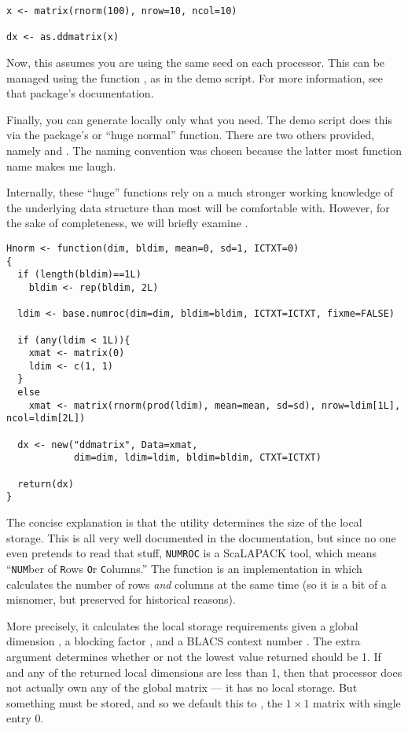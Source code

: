 \begin{lstlisting}[language=rr]
x <- matrix(rnorm(100), nrow=10, ncol=10)

dx <- as.ddmatrix(x)
\end{lstlisting}

Now, this assumes you are using the same seed on each processor.  This can be managed using the  function , as in the demo script.  For more information, see that package's documentation.

Finally, you can generate locally only what you need.  The demo script does this via the  package's  or ``huge normal'' function.  There are two others provided, namely  and .  The naming convention was chosen because the latter most function name makes me laugh.

Internally, these ``huge'' functions rely on a much stronger working knowledge of the underlying data structure than most will be comfortable with.  However, for the sake of completeness, we will briefly examine .

\begin{lstlisting}[language=rr,title=Hnorm()]
Hnorm <- function(dim, bldim, mean=0, sd=1, ICTXT=0)
{
  if (length(bldim)==1L)
    bldim <- rep(bldim, 2L)
  
  ldim <- base.numroc(dim=dim, bldim=bldim, ICTXT=ICTXT, fixme=FALSE)
    
  if (any(ldim < 1L)){
    xmat <- matrix(0)
    ldim <- c(1, 1)
  }
  else
    xmat <- matrix(rnorm(prod(ldim), mean=mean, sd=sd), nrow=ldim[1L], ncol=ldim[2L])
              
  dx <- new("ddmatrix", Data=xmat,
            dim=dim, ldim=ldim, bldim=bldim, CTXT=ICTXT)
            
  return(dx)
}
\end{lstlisting}

The concise explanation is that the  utility determines the size of the local storage.  This is all very well documented in the  documentation, but since no one even pretends to read that stuff, \texttt{NUMROC} is a ScaLAPACK tool, which means ``\texttt{NUM}ber of \texttt{R}ows \texttt{O}r \texttt{C}olumns.''  The function  is an implementation in  which calculates the number of rows \emph{and} columns at the same time (so it is a bit of a misnomer, but preserved for historical reasons).  

More precisely, it calculates the local storage requirements given a global dimension , a blocking factor , and a BLACS context number .  The extra argument  determines whether or not the lowest value returned should be 1.  If  and any of the returned local dimensions are less than 1, then that processor does not actually own any of the global matrix --- it has no local storage.  But something must be stored, and so we default this to , the $1\times 1$ matrix with single entry 0.


